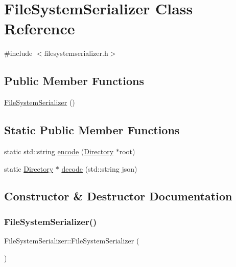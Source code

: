 \hypertarget{class_file_system_serializer}{}\section{File\+System\+Serializer Class Reference}
\label{class_file_system_serializer}


{\ttfamily \#include $<$filesystemserializer.\+h$>$}

\subsection*{Public Member Functions}
\begin{DoxyCompactItemize}
\item 
\hyperlink{class_file_system_serializer_a2c4786d82ec0f26318ac869a7361ce50}{File\+System\+Serializer} ()
\end{DoxyCompactItemize}
\subsection*{Static Public Member Functions}
\begin{DoxyCompactItemize}
\item 
static std\+::string \hyperlink{class_file_system_serializer_aef096d9b5936bddd4beac3dc9181c28f}{encode} (\hyperlink{class_directory}{Directory} $\ast$root)
\item 
static \hyperlink{class_directory}{Directory} $\ast$ \hyperlink{class_file_system_serializer_a9a32306fcb9133696c1b5f795eaa1933}{decode} (std\+::string json)
\end{DoxyCompactItemize}


\subsection{Constructor \& Destructor Documentation}
\mbox{\label{class_file_system_serializer_a2c4786d82ec0f26318ac869a7361ce50}} 
\subsubsection{\texorpdfstring{File\+System\+Serializer()}{FileSystemSerializer()}}
{\footnotesize\ttfamily File\+System\+Serializer\+::\+File\+System\+Serializer (\begin{DoxyParamCaption}{ }\end{DoxyParamCaption})}




